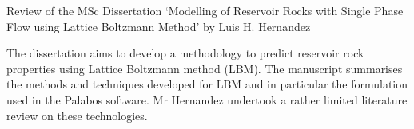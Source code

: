\documentclass[14pt,twoside]{report}
\begin{document}

\clearpage

\vfill 




\bigskip

\begin{center}
{\Large Review of the MSc Dissertation `Modelling of Reservoir Rocks with Single Phase Flow using Lattice Boltzmann Method' by Luis H. Hernandez}
\end{center}

\medskip

The dissertation aims to develop a methodology to predict reservoir rock properties using Lattice Boltzmann method (LBM). The manuscript summarises the methods and techniques developed for LBM and in particular the formulation used in the Palabos software. Mr Hernandez undertook a rather limited literature review on these technologies.
\end{document}
